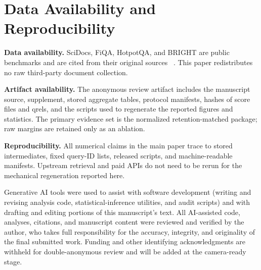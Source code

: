 \documentclass[acmsmall,anonymous,review]{acmart}
\begin{document}
\section{Data Availability and Reproducibility}
\label{sec:data-availability}

\textbf{Data availability.} SciDocs, FiQA, HotpotQA, and BRIGHT are public
benchmarks and are cited from their original sources
~\cite{cohan2020scidocs,maia2018fiqa,yang2018hotpotqa,su2024bright}. This
paper redistributes no raw third-party document collection.

\textbf{Artifact availability.} The anonymous review artifact includes the
manuscript source, supplement, stored aggregate tables, protocol manifests,
hashes of score files and qrels, and the scripts used to regenerate the
reported figures and statistics. The primary evidence set is the normalized
retention-matched package; raw margins are retained only as an ablation.

\textbf{Reproducibility.} All numerical claims in the main paper trace to
stored intermediates, fixed query-ID lists, released scripts, and
machine-readable manifests. Upstream retrieval and paid APIs do not need to
be rerun for the mechanical regeneration reported here.

\begin{acks}
Generative AI tools were used to assist with software development (writing
and revising analysis code, statistical-inference utilities, and audit
scripts) and with drafting and editing portions of this manuscript's text.
All AI-assisted code, analyses, citations, and manuscript content were
reviewed and verified by the author, who takes full responsibility for the
accuracy, integrity, and originality of the final submitted work.
Funding and other identifying acknowledgments are withheld for
double-anonymous review and will be added at the camera-ready stage.
\end{acks}



\end{document}
